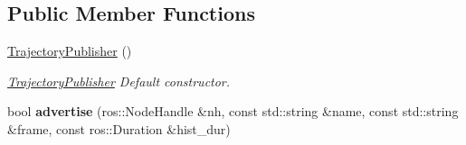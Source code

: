 \subsection*{Public Member Functions}
\begin{DoxyCompactItemize}
\item 
\hyperlink{classow__pub_1_1TrajectoryPublisher_ae486825e80e72360780d6865cdd06569}{Trajectory\+Publisher} ()\hypertarget{classow__pub_1_1TrajectoryPublisher_ae486825e80e72360780d6865cdd06569}{}\label{classow__pub_1_1TrajectoryPublisher_ae486825e80e72360780d6865cdd06569}

\begin{DoxyCompactList}\small\item\em \hyperlink{classow__pub_1_1TrajectoryPublisher}{Trajectory\+Publisher} Default constructor. \end{DoxyCompactList}\item 
bool {\bfseries advertise} (ros\+::\+Node\+Handle \&nh, const std\+::string \&name, const std\+::string \&frame, const ros\+::\+Duration \&hist\+\_\+dur)\hypertarget{classow__pub_1_1TrajectoryPublisher_aa13e4a93377f22aae4bc412499387eb8}{}\label{classow__pub_1_1TrajectoryPublisher_aa13e4a93377f22aae4bc412499387eb8}


\end{DoxyCompactItemize}
